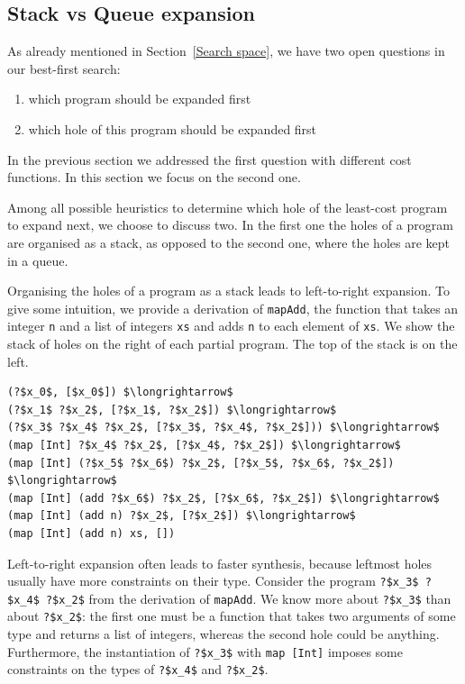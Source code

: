 \subsection{Stack vs Queue expansion}\label{Stack vs Queue}
As already mentioned in Section~\ref{Search space}, we have two open questions in our best-first search:
\begin{enumerate}[1.]
\item which program should be expanded first
\item which hole of this program should be expanded first
\end{enumerate}
In the previous section we addressed the first question with different cost functions. In this section we focus on the second one.

Among all possible heuristics to determine which hole of the least-cost program to expand next, we choose to discuss two. In the first one the holes of a program are organised as a stack, as opposed to the second one, where the holes are kept in a queue.

Organising the holes of a program as a stack leads to left-to-right expansion. To give some intuition, we provide a derivation of \lstinline?mapAdd?, the function that takes an integer \lstinline!n! and a list of integers \lstinline!xs! and adds \lstinline!n! to each element of \lstinline!xs!. We show the stack of holes on the right of each partial program. The top of the stack is on the left.
\begin{lstlisting}[style=plain]
(?$x_0$, [$x_0$]) $\longrightarrow$
(?$x_1$ ?$x_2$, [?$x_1$, ?$x_2$]) $\longrightarrow$
(?$x_3$ ?$x_4$ ?$x_2$, [?$x_3$, ?$x_4$, ?$x_2$])) $\longrightarrow$
(map [Int] ?$x_4$ ?$x_2$, [?$x_4$, ?$x_2$]) $\longrightarrow$
(map [Int] (?$x_5$ ?$x_6$) ?$x_2$, [?$x_5$, ?$x_6$, ?$x_2$]) $\longrightarrow$
(map [Int] (add ?$x_6$) ?$x_2$, [?$x_6$, ?$x_2$]) $\longrightarrow$
(map [Int] (add n) ?$x_2$, [?$x_2$]) $\longrightarrow$
(map [Int] (add n) xs, [])
\end{lstlisting}
Left-to-right expansion often leads to faster synthesis, because leftmost holes usually have more constraints on their type. Consider the program \lstinline!?$x_3$ ?$x_4$ ?$x_2$! from the derivation of \lstinline?mapAdd?. We know more about \lstinline!?$x_3$! than about \lstinline!?$x_2$!: the first one must be a function that takes two arguments of some type and returns a list of integers, whereas the second hole could be anything. Furthermore, the instantiation of \lstinline!?$x_3$! with \lstinline?map [Int]? imposes some constraints on the types of \lstinline!?$x_4$! and \lstinline!?$x_2$!.

